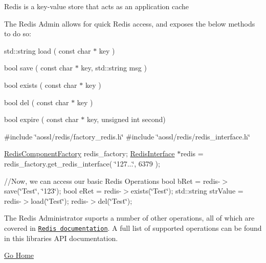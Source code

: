Redis is a key-\/value store that acts as an application cache

The Redis Admin allows for quick Redis access, and exposes the below methods to do so\+:


\begin{DoxyItemize}
\item std\+::string load ( const char $\ast$ key )
\item bool save ( const char $\ast$ key, std\+::string msg )
\item bool exists ( const char $\ast$ key )
\item bool del ( const char $\ast$ key )
\item bool expire ( const char $\ast$ key, unsigned int second)

\#include \char`\"{}aossl/redis/factory\+\_\+redis.\+h\char`\"{} \#include \char`\"{}aossl/redis/redis\+\_\+interface.\+h\char`\"{}

\hyperlink{classRedisComponentFactory}{Redis\+Component\+Factory} redis\+\_\+factory; \hyperlink{classRedisInterface}{Redis\+Interface} $\ast$redis = redis\+\_\+factory.\+get\+\_\+redis\+\_\+interface( \char`\"{}127...\char`\"{}, 6379 );

//\+Now, we can access our basic Redis Operations bool b\+Ret = redis-\/$>$save(\char`\"{}\+Test\char`\"{}, \char`\"{}123\char`\"{}); bool e\+Ret = redis-\/$>$exists(\char`\"{}\+Test\char`\"{}); std\+::string str\+Value = redis-\/$>$load(\char`\"{}\+Test\char`\"{}); redis-\/$>$del(\char`\"{}\+Test\char`\"{});
\end{DoxyItemize}

The Redis Administrator suports a number of other operations, all of which are covered in \href{http://redis.io/commands}{\tt Redis\textquotesingle{} documentation}. A full list of supported operations can be found in this libraries A\+PI documentation.

\hyperlink{index}{Go Home} 